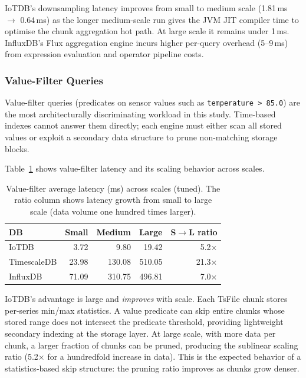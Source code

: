 IoTDB's downsampling latency improves from small to medium scale (1.81\,ms $\to$ 0.64\,ms)
as the longer medium-scale run gives the JVM JIT compiler time to optimise the chunk
aggregation hot path. At large scale it remains under 1\,ms. InfluxDB's Flux aggregation
engine incurs higher per-query overhead (5--9\,ms) from expression evaluation and operator
pipeline costs.

\subsubsection{Value-Filter Queries}

Value-filter queries (predicates on sensor values such as \texttt{temperature > 85.0})
are the most architecturally discriminating workload in this study. Time-based indexes
cannot answer them directly; each engine must either scan all stored values or exploit
a secondary data structure to prune non-matching storage blocks.

Table~\ref{tab:vfilter} shows value-filter latency and its scaling behavior across scales.

\begin{table}[t]
  \centering
  \caption{Value-filter average latency (ms) across scales (tuned).
  The ratio column shows latency growth from small to large scale (data volume one hundred times larger).}
  \label{tab:vfilter}
  \begin{tabular}{lrrrr}
    \hline
    \textbf{DB} & \textbf{Small} & \textbf{Medium} & \textbf{Large} & \textbf{S$\to$L ratio} \\
    \hline
    IoTDB       &   3.72 &    9.80 &   19.42 &  5.2$\times$ \\
    TimescaleDB &  23.98 &  130.08 &  510.05 & 21.3$\times$ \\
    InfluxDB    &  71.09 &  310.75 &  496.81 &  7.0$\times$ \\
    \hline
  \end{tabular}
\end{table}

IoTDB's advantage is large and \textit{improves} with scale. Each TsFile chunk stores
per-series min/max statistics. A value predicate can skip entire chunks whose stored range
does not intersect the predicate threshold, providing lightweight secondary indexing at
the storage layer. At large scale, with more data per chunk, a larger fraction of chunks
can be pruned, producing the sublinear scaling ratio (5.2$\times$ for a hundredfold increase in data).
This is the expected behavior of a statistics-based skip structure: the pruning ratio
improves as chunks grow denser.

